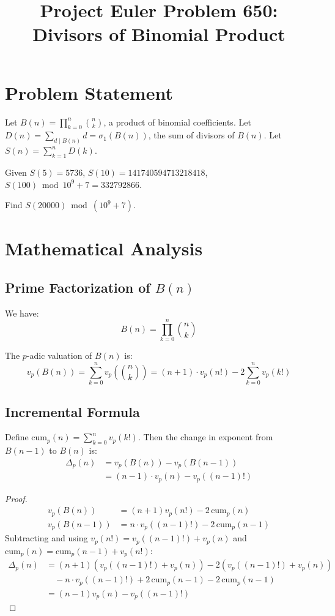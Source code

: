 \documentclass[12pt]{article}
\title{Project Euler Problem 650: Divisors of Binomial Product}
\author{}
\date{}
\begin{document}
\maketitle

\section{Problem Statement}

Let $B(n) = \prod_{k=0}^{n} \binom{n}{k}$, a product of binomial coefficients.
Let $D(n) = \sum_{d \mid B(n)} d = \sigma_1(B(n))$, the sum of divisors of $B(n)$.
Let $S(n) = \sum_{k=1}^{n} D(k)$.

Given $S(5) = 5736$, $S(10) = 141740594713218418$, $S(100) \bmod 10^9+7 = 332792866$.

Find $S(20000) \bmod (10^9+7)$.

\section{Mathematical Analysis}

\subsection{Prime Factorization of $B(n)$}

We have:
\[
B(n) = \prod_{k=0}^{n} \binom{n}{k}
\]

The $p$-adic valuation of $B(n)$ is:
\[
v_p(B(n)) = \sum_{k=0}^{n} v_p\left(\binom{n}{k}\right) = (n+1) \cdot v_p(n!) - 2\sum_{k=0}^{n} v_p(k!)
\]

\subsection{Incremental Formula}

Define $\text{cum}_p(n) = \sum_{k=0}^{n} v_p(k!)$. Then the change in exponent from $B(n-1)$ to $B(n)$ is:
\begin{align}
\Delta_p(n) &= v_p(B(n)) - v_p(B(n-1)) \\
&= (n-1) \cdot v_p(n) - v_p((n-1)!)
\end{align}

\begin{proof}
\begin{align}
v_p(B(n)) &= (n+1) v_p(n!) - 2\,\text{cum}_p(n) \\
v_p(B(n-1)) &= n \cdot v_p((n-1)!) - 2\,\text{cum}_p(n-1)
\end{align}
Subtracting and using $v_p(n!) = v_p((n-1)!) + v_p(n)$ and $\text{cum}_p(n) = \text{cum}_p(n-1) + v_p(n!)$:
\begin{align}
\Delta_p(n) &= (n+1)(v_p((n-1)!) + v_p(n)) - 2(v_p((n-1)!) + v_p(n)) \\
&\quad - n \cdot v_p((n-1)!) + 2\,\text{cum}_p(n-1) - 2\,\text{cum}_p(n-1) \\
&= (n-1)v_p(n) - v_p((n-1)!)
\end{align}
\end{proof}
\end{document}
